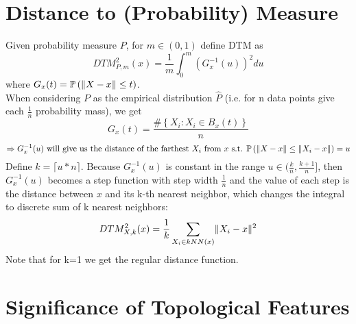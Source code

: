\documentclass[11pt]{article}
\theoremstyle{definition}
\theoremstyle{definition}
\begin{document}

\section{Distance to (Probability) Measure}
Given probability measure $P$, for $m \in (0,1)$ define DTM as
$$DTM^2_{P,m}(x) = \frac{1}{m} \int_{0}^{m} \left( G_x^{-1}(u)\right)^2 du$$
where $G_x(t) = \mathbb{P} \left( \mathopen\| X - x \mathclose\| \leq t \right)$.\\
When considering $P$ as the empirical distribution $\hat P$ (i.e. for n data points give each $\frac{1}{n}$ probability mass), we get
$$G_x(t) = \frac{\# \left\{X_i: X_i \in B_x(t) \right\}}{n}$$
$$\Rightarrow G_x^{-1}(u) \text{ will give us the distance of the farthest $X_i$ from $x$ s.t. } \mathbb{P} \left( \mathopen\| X-x \mathclose\| \leq \mathopen\| X_i - x \mathclose\| \right) = u$$
Define $k=\lceil u * n \rceil$. Because $G_x^{-1} (u)$ is constant in the range $u \in (\frac{k}{n}, \frac{k+1}{n}]$, then $G_x^{-1}(u)$ becomes a step function with step width $\frac{1}{n}$ and the value of each step is the distance between $x$ and its k-th nearest neighbor, which changes the integral to discrete sum of k nearest neighbors:
$$DTM^2_{X,k} (x) =\frac{1}{k} \sum_{X_i \in kNN(x)} \mathopen\| X_i - x \mathclose\|^2$$
Note that for k=1 we get the regular distance function.


\section{Significance of Topological Features}
\end{document}
